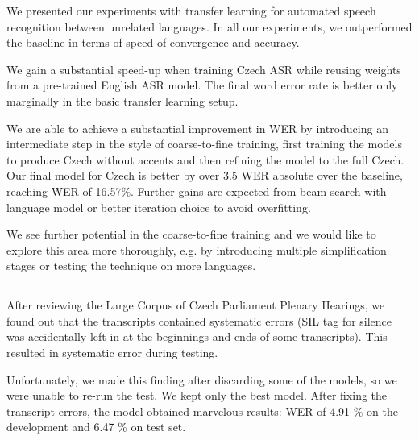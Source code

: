 We presented our experiments with transfer learning for automated speech recognition between unrelated languages.
In all our experiments, we outperformed the baseline in terms of speed of convergence and accuracy.

We gain a substantial speed-up when training Czech ASR while reusing weights from a pre-trained English ASR model. The final word error rate is better only marginally in the basic transfer learning setup.

We are able to achieve a substantial improvement in WER by introducing an intermediate step in the style of coarse-to-fine training, first training the models to produce Czech without accents and then refining the model to the full Czech.
Our final model for Czech is better by over 3.5 WER absolute over the baseline, reaching WER of 16.57\%. Further gains are expected from beam-search with language model or better iteration choice to avoid overfitting.


We see further potential in the coarse-to-fine training and we would like to explore this area more thoroughly, e.g. by introducing multiple simplification stages or testing the technique on more languages.


\subsection{}
After reviewing the Large Corpus of Czech Parliament Plenary Hearings, we found out that the transcripts contained systematic errors (SIL tag for silence was accidentally left in at the beginnings and ends of some transcripts). This resulted in systematic error during testing. 

Unfortunately, we made this finding after discarding some of the models, so we were unable to re-run the test. We kept only the best model. After fixing the transcript errors, the model obtained marvelous results: WER of 4.91 \% on the development and 6.47 \% on test set.

\pagebreak



